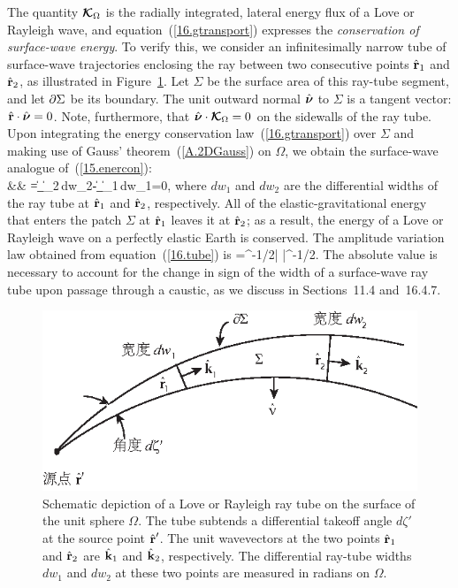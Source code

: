 The quantity $\mbox{\boldmath$\cal K$}_{\Omega}$ is the radially integrated,
lateral energy flux of a Love or Rayleigh wave, and
equation~(\ref{16.gtransport}) expresses the
{\em conservation of surface-wave energy\/}.
%
%
To verify this, we consider an infinitesimally
narrow tube of surface-wave trajectories enclosing
the ray between two consecutive points $\mbox{$\hat{\mbox{${\bf r}$}}$}_1$ and
$\mbox{$\hat{\mbox{${\bf r}$}}$}_2$, as illustrated in Figure~\ref{fig:16.tube}.
Let $\Sigma$ be the surface area of this ray-tube segment,
and let $\mbox{$\partial$}\Sigma$ be its boundary.  The unit outward normal
$\mbox{$\hat{\mbox{\boldmath $\bf \nu$}}$}$ to $\Sigma$ is a tangent vector: $\mbox{$\hat{\mbox{${\bf r}$}}$}\cdot\mbox{$\hat{\mbox{\boldmath $\bf \nu$}}$}=0$.
Note, furthermore, that $\mbox{$\hat{\mbox{\boldmath $\bf \nu$}}$}\cdot\mbox{\boldmath$\cal K$}_\Omega=0$ on the sidewalls
of the ray tube. Upon integrating the energy
conservation law~(\ref{16.gtransport}) over $\Sigma$
and making use of Gauss' theorem~(\ref{A.2DGauss}) on $\Omega$,
we obtain the surface-wave analogue of~(\ref{15.enercon}):
\eqa \label{16.tube} 
\nonumber \\
&&\mbox{}
=\|\bsK_\Omega\|_2\,dw_2-\|\bsK_\Omega\|_1\,dw_1=0,
\ena
where $dw_1$ and $dw_2$ are the differential widths of the
ray tube at $\mbox{$\hat{\mbox{${\bf r}$}}$}_1$ and $\mbox{$\hat{\mbox{${\bf r}$}}$}_2$, respectively.  All of
the elastic-gravitational energy that enters the patch
$\Sigma$ at $\mbox{$\hat{\mbox{${\bf r}$}}$}_1$ leaves it at $\mbox{$\hat{\mbox{${\bf r}$}}$}_2$; as a result,
the energy of a Love or Rayleigh wave on a perfectly elastic
Earth is conserved.  The amplitude variation law obtained
from equation~(\ref{16.tube}) is
\eq \label{16.uglyamp}
=^{-1/2}\left|
\right|^{-1/2}.
\en
The absolute value is necessary to account for the
change in sign of the width of a surface-wave ray tube
upon passage through a caustic, as we discuss in
Sections~11.4 and~16.4.7.
\begin{figure}[!t]
\begin{center}
\includegraphics{../figures/chap16/fig01.eps}
\end{center}
\caption[tube]{\label{fig:16.tube}
Schematic depiction of a Love or Rayleigh ray tube on the surface of the unit
sphere $\Omega$.  The tube subtends a differential takeoff angle
%
$d\zeta'$ at the source point $\mbox{$\hat{\mbox{${\bf r}$}}$}'$.
The unit wavevectors at the two points $\mbox{$\hat{\mbox{${\bf r}$}}$}_1$ and $\mbox{$\hat{\mbox{${\bf r}$}}$}_2$ are
$\mbox{$\hat{\mbox{${\bf k}$}}$}_1$ and $\mbox{$\hat{\mbox{${\bf k}$}}$}_2$, respectively.  The differential
ray-tube widths $dw_1$ and $dw_2$ at these two points
are measured in radians on $\Omega$.}
\end{figure}
